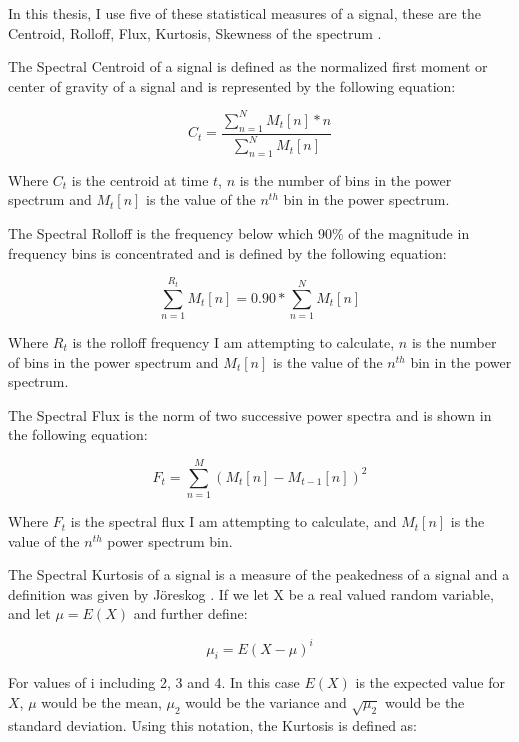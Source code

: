 In this thesis, I use five of these statistical measures of a signal,
these are the Centroid, Rolloff, Flux, Kurtosis, Skewness of the
spectrum \cite{tzanetakis2008marsyas} \cite{klapuri2006book}.  

The Spectral Centroid of a signal is defined as the normalized first
moment or center of gravity of a signal \cite{li2006intelligent} and is
represented by the following equation:

\begin{equation} 
C_t = \frac{\sum_{n=1}^N M_t[n] * n}{\sum_{n=1}^N M_t[n]} 
\end{equation}

\noindent Where $C_t$ is the centroid at time $t$, $n$ is the number of bins in
the power spectrum and $M_t[n]$ is the value of the $n^{th}$ bin in
the power spectrum.

The Spectral Rolloff is the frequency below which 90\% of the magnitude in
frequency bins is concentrated and is defined by the following
equation:

\begin{equation} 
\sum_{n=1}^{R_t} M_t[n] = 0.90 * \sum_{n=1}^N M_t[n] 
\end{equation}

\noindent Where $R_t$ is the rolloff frequency I am attempting to calculate,
$n$ is the number of bins in the power spectrum and $M_t[n]$ is the
value of the $n^{th}$ bin in the power spectrum.

The Spectral Flux is the norm of two successive power
spectra and is shown in the following equation:

\begin{equation} 
F_t = \sum_{n=1}^M (M_t[n] - M_{t-1}[n])^2 
\end{equation}

\noindent Where $F_t$ is the spectral flux I am attempting to calculate,
and $M_t[n]$ is the value of the $n^{th}$ power spectrum bin.

The Spectral Kurtosis of a signal \cite{dubnov1996testing} is a
measure of the peakedness of a signal and a definition was given by
J{\"o}reskog \cite{joreskog1999formulas}.  If we let X be
a real valued random variable, and let $\mu = E(X)$ and further
define:

\begin{equation} 
\mu_i = E(X - \mu)^i 
\end{equation}

\noindent For values of i including 2, 3 and 4.  In this case $E(X)$ is the
expected value for $X$, $\mu$ would be the mean, $\mu_2$ would be the
variance and $\sqrt{\mu_2}$ would be the standard deviation.  Using
this notation, the Kurtosis is defined as:


